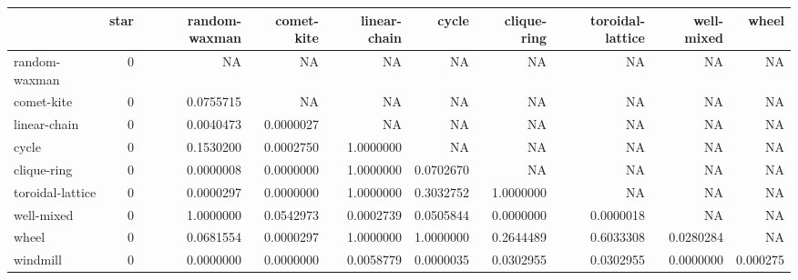 \documentclass[
]{book}
\newenvironment{Shaded}{\begin{snugshade}}{\end{snugshade}}
\newcommand{\AttributeTok}[1]{\textcolor[rgb]{0.77,0.63,0.00}{#1}}
\newcommand{\ConstantTok}[1]{\textcolor[rgb]{0.00,0.00,0.00}{#1}}
\newcommand{\FunctionTok}[1]{\textcolor[rgb]{0.00,0.00,0.00}{#1}}
\newcommand{\NormalTok}[1]{#1}
\newcommand{\OtherTok}[1]{\textcolor[rgb]{0.56,0.35,0.01}{#1}}
\newcommand{\SpecialCharTok}[1]{\textcolor[rgb]{0.00,0.00,0.00}{#1}}
\newcommand{\StringTok}[1]{\textcolor[rgb]{0.31,0.60,0.02}{#1}}
\begin{document}
\begin{Shaded}
\end{Shaded}

\begin{table}
\centering
\begin{tabular}[t]{l|r|r|r|r|r|r|r|r|r}
\hline
  & star & random-waxman & comet-kite & linear-chain & cycle & clique-ring & toroidal-lattice & well-mixed & wheel\\
\hline
random-waxman & 0 & NA & NA & NA & NA & NA & NA & NA & NA\\
\hline
comet-kite & 0 & 0.0755715 & NA & NA & NA & NA & NA & NA & NA\\
\hline
linear-chain & 0 & 0.0040473 & 0.0000027 & NA & NA & NA & NA & NA & NA\\
\hline
cycle & 0 & 0.1530200 & 0.0002750 & 1.0000000 & NA & NA & NA & NA & NA\\
\hline
clique-ring & 0 & 0.0000008 & 0.0000000 & 1.0000000 & 0.0702670 & NA & NA & NA & NA\\
\hline
toroidal-lattice & 0 & 0.0000297 & 0.0000000 & 1.0000000 & 0.3032752 & 1.0000000 & NA & NA & NA\\
\hline
well-mixed & 0 & 1.0000000 & 0.0542973 & 0.0002739 & 0.0505844 & 0.0000000 & 0.0000018 & NA & NA\\
\hline
wheel & 0 & 0.0681554 & 0.0000297 & 1.0000000 & 1.0000000 & 0.2644489 & 0.6033308 & 0.0280284 & NA\\
\hline
windmill & 0 & 0.0000000 & 0.0000000 & 0.0058779 & 0.0000035 & 0.0302955 & 0.0302955 & 0.0000000 & 0.000275\\
\hline
\end{tabular}
\end{table}
\end{document}
